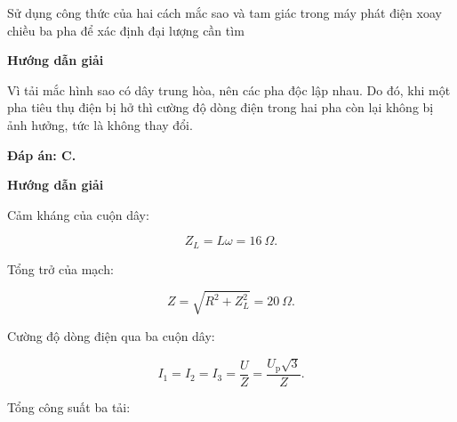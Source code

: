 \begin{dang}{Sử dụng công thức của hai cách mắc sao và tam giác trong máy phát điện xoay chiều ba pha để xác định đại lượng cần tìm}
	{	\begin{center}
			\textbf{Hướng dẫn giải}
		\end{center}
		
		Vì tải mắc hình sao có dây trung hòa, nên các pha độc lập nhau. Do đó, khi một pha tiêu thụ điện bị hở thì cường độ dòng điện trong hai pha còn lại không bị ảnh hưởng, tức là không thay đổi.
		
		\textbf{Đáp án: C.}
	}
	{	\begin{center}
			\textbf{Hướng dẫn giải}
		\end{center}
		
		Cảm kháng của cuộn dây:
		
		$$Z_L = L\omega =\SI{16}{\Omega}.$$
		
		Tổng trở của mạch:
		
		$$Z =\sqrt {R^2 +Z^2_L}=\SI{20}{\Omega}.$$
		
		Cường độ dòng điện qua ba cuộn dây:
		
		$$I_1 =I_2 =I_3 = \dfrac{U}{Z} = \dfrac{U_\text{p} \sqrt 3}{Z}.$$
		
		Tổng công suất ba tải:
		
}
\end{dang}
